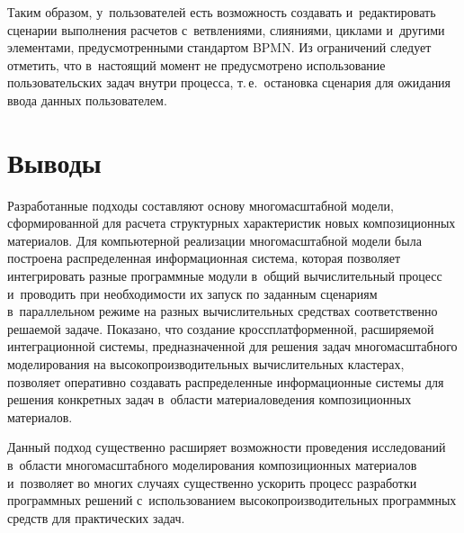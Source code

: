 \begin{multicols}{2}
  Таким образом, у~пользователей есть воз\-мож\-ность создавать 
и~редактировать сценарии выполнения расчетов с~ветвлениями, слияниями, 
цик\-ла\-ми и~другими элементами, предусмот\-рен\-ны\-ми стандартом BPMN. Из 
ограничений следует отметить, что в~настоящий момент не предусмот\-ре\-но 
использование пользовательских задач внут\-ри процесса, т.\,е.\ остановка 
сценария для ожидания ввода данных пользователем.

\vspace*{-10pt}

\section{Выводы}

\vspace*{-2pt}

   Разработанные подходы составляют основу многомасштабной модели, 
сформированной для расчета структурных характеристик новых композиционных 
материалов. Для компьютерной реализации многомасштабной модели была 
построена распределенная информационная сис\-те\-ма, которая позволяет 
интегрировать разные программные модули в~общий вы\-чис\-ли\-тель\-ный процесс 
и~проводить при не\-об\-хо\-ди\-мости их запуск по заданным сценариям 
в~параллельном режиме на разных вычислительных средствах соответственно 
ре\-ша\-емой\linebreak
 задаче. Показано, что создание кроссплатформенной, расширяемой 
интеграционной сис\-те\-мы, предназначенной для решения задач многомасштабного 
моделирования на высокопроизводительных\linebreak
 вычислительных кластерах, 
позволяет оперативно создавать распределенные информационные сис\-те\-мы для 
решения конкретных задач в~области материаловедения композиционных 
ма\-те\-ри\-алов.


   
   Данный подход существенно расширяет возможности проведения 
исследований в~об\-ласти многомасштабного моделирования композиционных 
материалов и~позволяет во многих случаях существенно ускорить процесс 
разработки программных решений с~использованием высокопроизводительных 
программных средств для практических задач.

\vspace*{-6pt}
   
{\small\frenchspacing
 {%
 \begin{thebibliography}{9}


\end{thebibliography}}}
\end{multicols}
